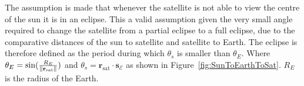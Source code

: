 
The assumption is made that whenever the satellite is not able to view the centre of the sun it is in an eclipse. This a valid assumption given the very small angle required to change the satellite from a partial eclipse to a full eclipse, due to the comparative distances of the sun to satellite and satellite to Earth. The eclipse is therefore defined as the period during which $\theta_{s}$ is smaller than $\theta_E$. Where $\theta_E = \text{sin}(\frac{R_E}{\left\lVert\mathbf{r}_{\text{sat}}\right\rVert})$ and $\theta_{s} = \mathbf{r}_{\text{sat}} \cdot \mathbf{s}_{\mathcal{E}}$ as shown in Figure~\ref{fig:SunToEarthToSat}. $R_E$ is the radius of the Earth.

